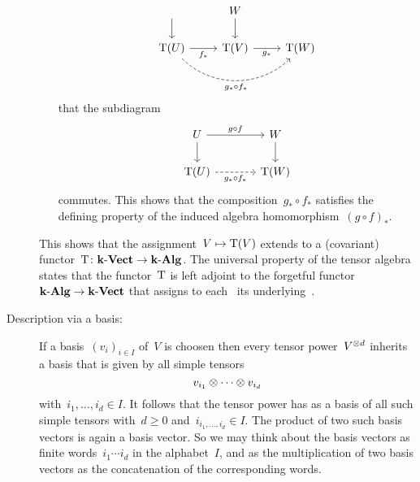 \begin{recall}
\begin{description}
\begin{itemize}
\[\begin{tikzcd}
              \arrow{d}
              &
              W
              \arrow{d}
              \\
              \Tensor(U)
              \arrow{r}[below]{f_*}
              \arrow[dashed, bend right=45]{rr}[below]{g_* \circ f_*}
              &
              \Tensor(V)
              \arrow{r}[below]{g_*}
              &
              \Tensor(W)
            \end{tikzcd}
          \]
          that the subdiagram
          \[
            \begin{tikzcd}[column sep = large]
              U
              \arrow{r}[above]{g \circ f}
              \arrow{d}
              &
              W
              \arrow{d}
              \\
              \Tensor(U)
              \arrow[dashed]{r}[below]{g_* \circ f_*}
              &
              \Tensor(W)
            \end{tikzcd}
          \]
          commutes.
          This shows that the composition~$g_* \circ f_*$ satisfies the defining property of the induced algebra homomorphism~$(g \circ f)_*$.
      \end{itemize}
      
      This shows that the assignment~$V \mapsto \operatorname{T}(V)$ extends to a (covariant) functor~$\operatorname{T} \colon \mathbf{k}\text{-}\mathbf{Vect} \to \mathbf{k}\text{-}\mathbf{Alg}$.
      The universal property of the tensor algebra states that the functor~$\operatorname{T}$ is left adjoint to the forgetful functor~$\mathbf{k}\text{-}\mathbf{Alg} \to \mathbf{k}\text{-}\mathbf{Vect}$ that assigns to each~{\algebra{$\kf$}} its underlying~{\vectorspace{$\kf$}}.
    
    \item[Description via a basis:]
      If a basis~$(v_i)_{i \in I}$ of~$V$ is choosen then every tensor power~$V^{\otimes d}$ inherits a basis that is given by all simple tensors
      \[
        v_{i_1} \otimes \dotsb \otimes v_{i_d}
      \]
      with~$i_1, \dotsc, i_d \in I$.
      It follows that the tensor power has as a basis of all such simple tensors with~$d \geq 0$ and~$i_{i_1, \dotsc, i_d} \in I$.
      The product of two such basis vectors is again a basis vector.
      So we may think about the basis vectors as finite words~$i_1 \dotsm i_d$ in the alphabet~$I$, and as the multiplication of two basis vectors as the concatenation of the corresponding words.
      

\end{description}
\end{recall}
